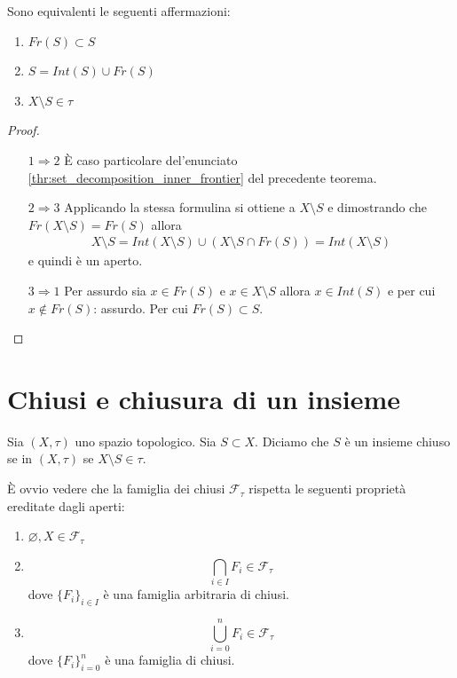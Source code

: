 \begin{theorem}
	Sono equivalenti le seguenti affermazioni:
	\begin{enumerate}
		\item $Fr(S) \subset S$
		\item $S = Int(S) \cup Fr(S)$
		\item $X \setminus S \in \tau$ 
	\end{enumerate}
\end{theorem}
\begin{proof}
	\begin{enumerate}
		\item[$1\Rightarrow 2$] È caso particolare del'enunciato \ref{thr:set_decomposition_inner_frontier} del precedente teorema.
		\item[$2 \Rightarrow 3$] Applicando la stessa formulina si ottiene a $X \setminus S$ e dimostrando che $Fr(X\setminus S) = Fr(S)$ allora 
		\begin{equation}
		\begin{aligned}
			X \setminus S = Int(X\setminus S) \cup (X \setminus S \cap Fr(S)) = Int(X \setminus S)
		\end{aligned}
		\end{equation}
		 e quindi è un aperto.
		\item[$3 \Rightarrow 1$] Per assurdo sia $x \in Fr(S)$ e $x \in X \setminus S$ allora $x\in Int(S)$ e per cui $x \notin Fr(S)$: assurdo. Per cui $Fr(S) \subset S$.
	\end{enumerate}
\end{proof}

\section{Chiusi e chiusura di un insieme}

\begin{definition}
	Sia $(X, \tau)$ uno spazio topologico. Sia $S \subset X$. Diciamo che $S$ è un insieme chiuso se in $(X,\tau)$ se $X \setminus S \in \tau$.
\end{definition}

\begin{remark}
	È ovvio vedere che la famiglia dei chiusi $\mathcal{F}_\tau$ rispetta le seguenti proprietà ereditate dagli aperti:
	\begin{enumerate}
		\item $\varnothing, X \in \mathcal{F}_\tau$
		\item \begin{equation*}
				\bigcap_{i \in I} F_i \in \mathcal{F}_\tau
			\end{equation*}
		dove $\{F_i\}_{i\in I}$ è una famiglia arbitraria di chiusi.
		\item 
			\begin{equation*}
				\bigcup^{n}_{i = 0} F_i \in \mathcal{F}_\tau
			\end{equation*}
		dove $\{F_i\}^n_{i=0}$ è una famiglia di chiusi.
	\end{enumerate}
\end{remark}

